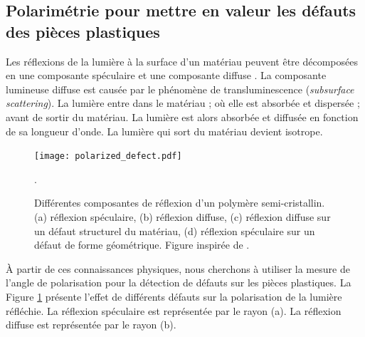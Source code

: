 \subsection{Polarimétrie pour mettre en valeur les défauts des pièces plastiques}
Les réflexions de la lumière à la surface d'un matériau peuvent être décomposées en une composante spéculaire et une composante diffuse \cite{hanrahan_reflection_1993}.
La composante lumineuse diffuse est causée par le phénomène de transluminescence (\textit{subsurface scattering}).
La lumière entre dans le matériau ; où elle est absorbée et dispersée ; avant de sortir du matériau.
La lumière est alors absorbée et diffusée en fonction de sa longueur d'onde.
La lumière qui sort du matériau devient isotrope.  %

\begin{figure}[tbhp]
	\centering
	\texttt{[image: polarized\_defect.pdf]}
	\caption{Différentes composantes de réflexion d'un polymère semi-cristallin. (a) réflexion spéculaire, (b) réflexion diffuse, (c) réflexion diffuse sur un défaut structurel du matériau, (d) réflexion spéculaire sur un défaut de forme géométrique. Figure inspirée de \cite{debevec_acquiring_2000}.}
	\label{fig:polarized_defect}.
\end{figure}

À partir de ces connaissances physiques, nous cherchons à utiliser la mesure de l'angle de polarisation pour la détection de défauts sur les pièces plastiques.
La Figure \ref{fig:polarized_defect} présente l'effet de différents défauts sur la polarisation de la lumière réfléchie.
La réflexion spéculaire est représentée par le rayon (a).
La réflexion diffuse est représentée par le rayon (b).


